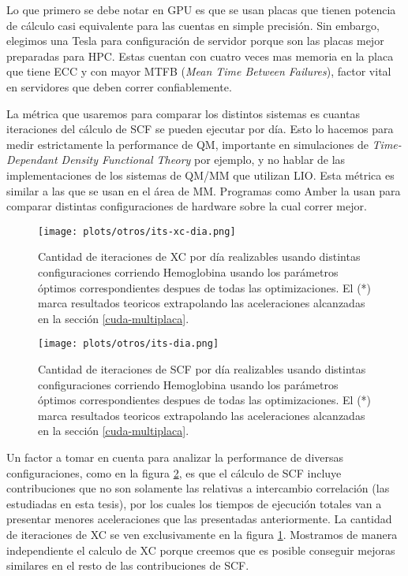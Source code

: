 
Lo que primero se debe notar en GPU es que se usan placas que tienen potencia de c\'alculo casi equivalente
para las cuentas en simple precisi\'on. Sin embargo, elegimos una Tesla para configuraci\'on de servidor
porque son las placas mejor preparadas para HPC. Estas cuentan con cuatro veces mas memoria en la placa
que tiene ECC y con mayor MTFB (\textit{Mean Time Between Failures}), factor vital en servidores
que deben correr confiablemente.

La m\'etrica que usaremos para comparar los distintos sistemas es cuantas iteraciones del c\'alculo de
SCF se pueden ejecutar por d\'ia. Esto lo hacemos para medir estrictamente la performance
de QM, importante en simulaciones de \textit{Time-Dependant Density Functional Theory} por ejemplo, y no
hablar de las implementaciones de los sistemas de QM/MM que utilizan LIO.
Esta m\'etrica es similar a las que se usan en el \'area de MM. Programas como Amber\cite{Amber} la usan para comparar
distintas configuraciones de hardware sobre la cual correr mejor.

\begin{figure}[htbp]
    \centering
    \texttt{[image: plots/otros/its-xc-dia.png]}
    \caption{Cantidad de iteraciones de XC por d\'ia realizables usando distintas configuraciones corriendo Hemoglobina usando los
              par\'ametros \'optimos correspondientes despues de todas las optimizaciones. El (*) marca resultados teoricos extrapolando
              las aceleraciones alcanzadas en la secci\'on \ref{cuda-multiplaca}.}
    \label{fig:its-xc-dia}
\end{figure}


\begin{figure}[htbp]
    \centering
    \texttt{[image: plots/otros/its-dia.png]}
    \caption{Cantidad de iteraciones de SCF por d\'ia realizables usando distintas configuraciones corriendo Hemoglobina usando los
              par\'ametros \'optimos correspondientes despues de todas las optimizaciones. El (*) marca resultados teoricos extrapolando
              las aceleraciones alcanzadas en la secci\'on \ref{cuda-multiplaca}.}
    \label{fig:its-dia}
\end{figure}

Un factor a tomar en cuenta para analizar la performance de diversas configuraciones, como en la figura \ref{fig:its-dia},
es que el c\'alculo de SCF incluye contribuciones que no son solamente las relativas a intercambio correlaci\'on
(las estudiadas en esta tesis), por los cuales los tiempos de ejecuci\'on totales van
a presentar menores aceleraciones que las presentadas anteriormente. La cantidad de iteraciones de XC se ven
exclusivamente en la figura \ref{fig:its-xc-dia}. Mostramos de manera independiente el calculo de XC porque
creemos que es posible conseguir mejoras similares en el resto de las contribuciones de SCF.

